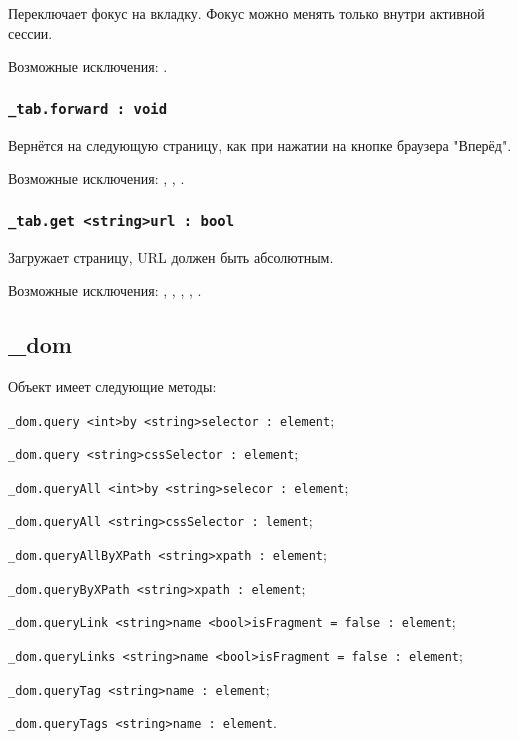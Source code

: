 Переключает фокус на вкладку. Фокус можно менять только внутри активной сессии.

Возможные исключения: .

\subsubsection{\lstinline|_tab.forward : void|}

Вернётся на следующую страницу, как при нажатии на кнопке браузера "Вперёд".

Возможные исключения: , , .

\subsubsection{\lstinline|_tab.get <string>url : bool|}

Загружает страницу, URL должен быть абсолютным.

Возможные исключения: , , , , .

\subsection{{\color{orange} \_dom}}

Объект \dom{} имеет следующие методы:
\begin{icItems}
	\item \lstinline|_dom.query <int>by <string>selector : element|;
	\item \lstinline|_dom.query <string>cssSelector : element|;
	\item \lstinline|_dom.queryAll <int>by <string>selecor : element|;
	\item \lstinline|_dom.queryAll <string>cssSelector : lement|;
	\item \lstinline|_dom.queryAllByXPath <string>xpath : element|;
	\item \lstinline|_dom.queryByXPath <string>xpath : element|;
	\item \lstinline|_dom.queryLink <string>name <bool>isFragment = false : element|;
	\item \lstinline|_dom.queryLinks <string>name <bool>isFragment = false : element|;
	\item \lstinline|_dom.queryTag <string>name : element|;
	\item \lstinline|_dom.queryTags <string>name : element|.
\end{icItems}

